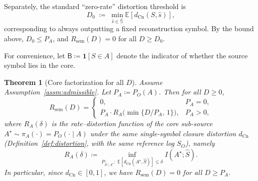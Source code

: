 \documentclass[twoside]{article}
\newtheorem{theorem}{Theorem}[section]
\newcommand{\Cn}{\mathrm{Cn}}
\newcommand{\sem}{\mathrm{sem}}
\newcommand{\E}{\mathbb{E}}
\newcommand{\1}{\mathbf{1}}
\begin{document}
Separately, the standard ``zero-rate'' distortion threshold is
\[
D_0 \;\coloneqq\; \min_{\hat s\in\hat{\mathbb{S}}} \E[d_{\Cn}(S,\hat s)],
\]
corresponding to always outputting a fixed reconstruction symbol. By the bound above, \(D_0\le P_A\), and \(R_{\sem}(D)=0\) for all
\(D\ge D_0\).

For convenience, let \(\mathsf{B}\coloneqq \1[S\in A]\) denote the indicator of whether the source symbol lies in the core.

\begin{theorem}[Core factorization for all \(D\)]
\label{thm:factorization}
Assume Assumption~\ref{assm:admissible}. Let \(P_A\coloneqq P_O(A)\).
Then for all \(D\ge 0\),
\[
R_{\sem}(D)=
\begin{cases}
0, & P_A=0,\\[1mm]
P_A \cdot R_A\!\bigl(\min\{D/P_A,\,1\}\bigr), & P_A>0,
\end{cases}
\]
where \(R_A(\delta)\) is the rate--distortion function of the \emph{core sub-source}
\(A^\star\sim \pi_A(\cdot)=P_O(\cdot\mid A)\) under the \emph{same} single-symbol closure distortion \(d_{\Cn}\)
(Definition~\ref{def:distortion}, with the same reference log \(S_O\)), namely
\[
R_A(\delta)\coloneqq 
\inf_{P_{\hat{S}\mid A^\star}:\ \E[d_{\Cn}(A^\star,\hat{S})]\le \delta} I(A^\star;\hat{S}).
\]
In particular, since \(d_{\Cn}\in[0,1]\), we have \(R_{\sem}(D)=0\) for all \(D\ge P_A\).
\end{theorem}
\end{document}
